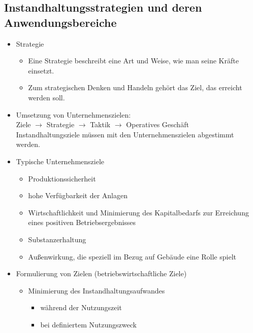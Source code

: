 \documentclass[fleqn,twoside,dvipsnames]{article}
\begin{document}
    \subsection{Instandhaltungsstrategien und deren Anwendungsbereiche}
        \begin{itemize}
            \item Strategie
                \begin{itemize}
                    \item Eine Strategie beschreibt eine Art und Weise, wie man seine Kräfte einsetzt.
                    \item Zum strategischen Denken und Handeln gehört das Ziel, das erreicht werden soll.
                \end{itemize}
            \item Umsetzung von Unternehmenszielen:\\
                Ziele $\rightarrow$ Strategie $\rightarrow$ Taktik $\rightarrow$ Operatives Geschäft\\
                Instandhaltungsziele müssen mit den Unternehmenszielen abgestimmt werden.
            \item Typische Unternehmensziele
                \begin{itemize}
                    \item Produktionssicherheit
                    \item hohe Verfügbarkeit der Anlagen 
                    \item Wirtschaftlichkeit und Minimierung des Kapitalbedarfs zur Erreichung eines positiven Betriebsergebnisses
                    \item Substanzerhaltung
                    \item Außenwirkung, die speziell im Bezug auf Gebäude eine Rolle spielt
                \end{itemize}
            \item Formulierung von Zielen (betriebswirtschaftliche Ziele)
                \begin{itemize}
                    \item Minimierung des Instandhaltungsaufwandes
                        \begin{itemize}
                            \item während der Nutzungszeit
                            \item bei definiertem Nutzungszweck
                        \end{itemize}

\end{itemize}
\end{itemize}
\end{document}
